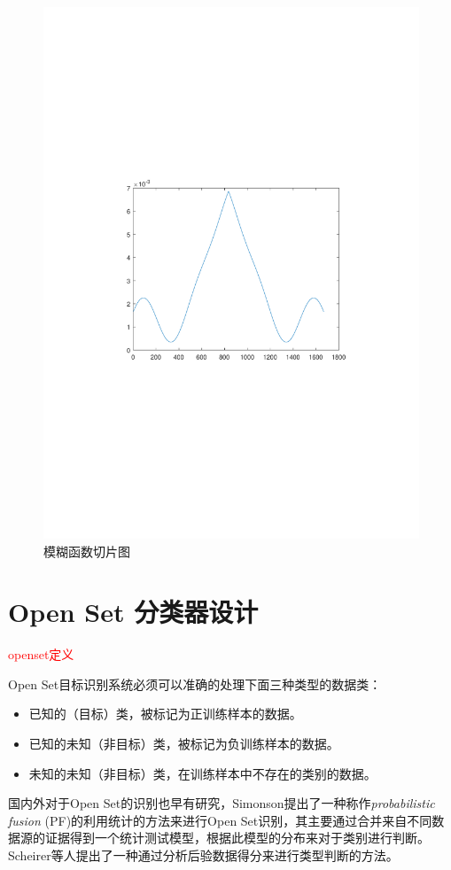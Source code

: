 \begin{figure}
	\centering
	\includegraphics[width=\textwidth]{figures/af.pdf}
	\caption{模糊函数切片图}
\end{figure}

\section{Open Set 分类器设计}
\textcolor{red}{openset定义}\cite{scheirer2013toward, jain2014multi}

Open Set目标识别系统必须可以准确的处理下面三种类型的数据类：
\begin{itemize}
	\item 已知的（目标）类，被标记为正训练样本的数据。
	\item 已知的未知（非目标）类，被标记为负训练样本的数据。
	\item 未知的未知（非目标）类，在训练样本中不存在的类别的数据。
\end{itemize}
国内外对于Open Set的识别也早有研究，Simonson\cite{simonson1998probabilistic}提出了一种称作\textit{probabilistic fusion} (PF)的利用统计的方法来进行Open Set识别，其主要通过合并来自不同数据源的证据得到一个统计测试模型，根据此模型的分布来对于类别进行判断。Scheirer等人\cite{scheirer2011meta}提出了一种通过分析后验数据得分来进行类型判断的方法。

